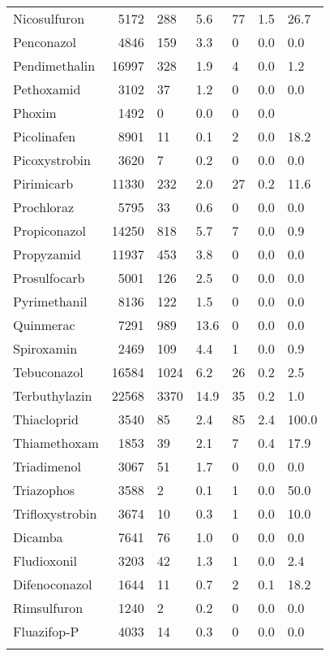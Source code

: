 \begin{longtable}{p{3cm}rR{1.4cm}R{1.4cm}R{1.4cm}R{1.4cm}R{1.4cm}}
  Nicosulfuron & 5172 & 288 & 5.6 & 77 & 1.5 & 26.7 \\ 
  Penconazol & 4846 & 159 & 3.3 &  0 & 0.0 & 0.0 \\ 
  Pendimethalin & 16997 & 328 & 1.9 &  4 & 0.0 & 1.2 \\ 
  Pethoxamid & 3102 & 37 & 1.2 &  0 & 0.0 & 0.0 \\ 
  Phoxim & 1492 &  0 & 0.0 &  0 & 0.0 &  \\ 
  Picolinafen & 8901 & 11 & 0.1 &  2 & 0.0 & 18.2 \\ 
  Picoxystrobin & 3620 &  7 & 0.2 &  0 & 0.0 & 0.0 \\ 
  Pirimicarb & 11330 & 232 & 2.0 & 27 & 0.2 & 11.6 \\ 
  Prochloraz & 5795 & 33 & 0.6 &  0 & 0.0 & 0.0 \\ 
  Propiconazol & 14250 & 818 & 5.7 &  7 & 0.0 & 0.9 \\ 
  Propyzamid & 11937 & 453 & 3.8 &  0 & 0.0 & 0.0 \\ 
  Prosulfocarb & 5001 & 126 & 2.5 &  0 & 0.0 & 0.0 \\ 
  Pyrimethanil & 8136 & 122 & 1.5 &  0 & 0.0 & 0.0 \\ 
  Quinmerac & 7291 & 989 & 13.6 &  0 & 0.0 & 0.0 \\ 
  Spiroxamin & 2469 & 109 & 4.4 &  1 & 0.0 & 0.9 \\ 
  Tebuconazol & 16584 & 1024 & 6.2 & 26 & 0.2 & 2.5 \\ 
  Terbuthylazin & 22568 & 3370 & 14.9 & 35 & 0.2 & 1.0 \\ 
  Thiacloprid & 3540 & 85 & 2.4 & 85 & 2.4 & 100.0 \\ 
  Thiamethoxam & 1853 & 39 & 2.1 &  7 & 0.4 & 17.9 \\ 
  Triadimenol & 3067 & 51 & 1.7 &  0 & 0.0 & 0.0 \\ 
  Triazophos & 3588 &  2 & 0.1 &  1 & 0.0 & 50.0 \\ 
  Trifloxystrobin & 3674 & 10 & 0.3 &  1 & 0.0 & 10.0 \\ 
  Dicamba & 7641 & 76 & 1.0 &  0 & 0.0 & 0.0 \\ 
  Fludioxonil & 3203 & 42 & 1.3 &  1 & 0.0 & 2.4 \\ 
  Difenoconazol & 1644 & 11 & 0.7 &  2 & 0.1 & 18.2 \\ 
  Rimsulfuron & 1240 &  2 & 0.2 &  0 & 0.0 & 0.0 \\ 
  Fluazifop-P & 4033 & 14 & 0.3 &  0 & 0.0 & 0.0 \\ 
   \bottomrule
\label{tab:rac_dat}
\end{longtable}
